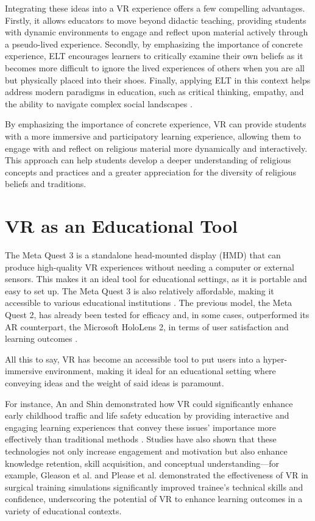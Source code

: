 \documentclass[conference]{IEEEtran}
\begin{document}
Integrating these ideas into a VR experience offers a few compelling advantages. Firstly, it allows educators to move beyond didactic teaching, providing students with dynamic environments to engage and reflect upon material actively through a pseudo-lived experience. Secondly, by emphasizing the importance of concrete experience, ELT encourages learners to critically examine their own beliefs as it becomes more difficult to ignore the lived experiences of others when you are all but physically placed into their shoes. Finally, applying ELT in this context helps address modern paradigms in education, such as critical thinking, empathy, and the ability to navigate complex social landscapes \cite{henderson_world_2000}.

By emphasizing the importance of concrete experience, VR can provide students with a more immersive and participatory learning experience, allowing them to engage with and reflect on religious material more dynamically and interactively. This approach can help students develop a deeper understanding of religious concepts and practices and a greater appreciation for the diversity of religious beliefs and traditions.

\section{VR as an Educational Tool}
The Meta Quest 3 is a standalone head-mounted display (HMD) that can produce high-quality VR experiences without needing a computer or external sensors. This makes it an ideal tool for educational settings, as it is portable and easy to set up. The Meta Quest 3 is also relatively affordable, making it accessible to various educational institutions \cite{quest_3}. The previous model, the Meta Quest 2, has already been tested for efficacy and, in some cases, outperformed its AR counterpart, the Microsoft HoloLens 2, in terms of user satisfaction and learning outcomes \cite{kyaw_comparing_2023}.

All this to say, VR has become an accessible tool to put users into a hyper-immersive environment, making it ideal for an educational setting where conveying ideas and the weight of said ideas is paramount.

For instance, An and Shin demonstrated how VR could significantly enhance early childhood traffic and life safety education by providing interactive and engaging learning experiences that convey these issues' importance more effectively than traditional methods \cite{an_teachers_2023}. Studies have also shown that these technologies not only increase engagement and motivation but also enhance knowledge retention, skill acquisition, and conceptual understanding—for example, Gleason et al. \cite{gleason_developing_2022} and Please et al. \cite{please_virtual_2024} demonstrated the effectiveness of VR in surgical training simulations significantly improved trainee's technical skills and confidence, underscoring the potential of VR to enhance learning outcomes in a variety of educational contexts.
\end{document}

